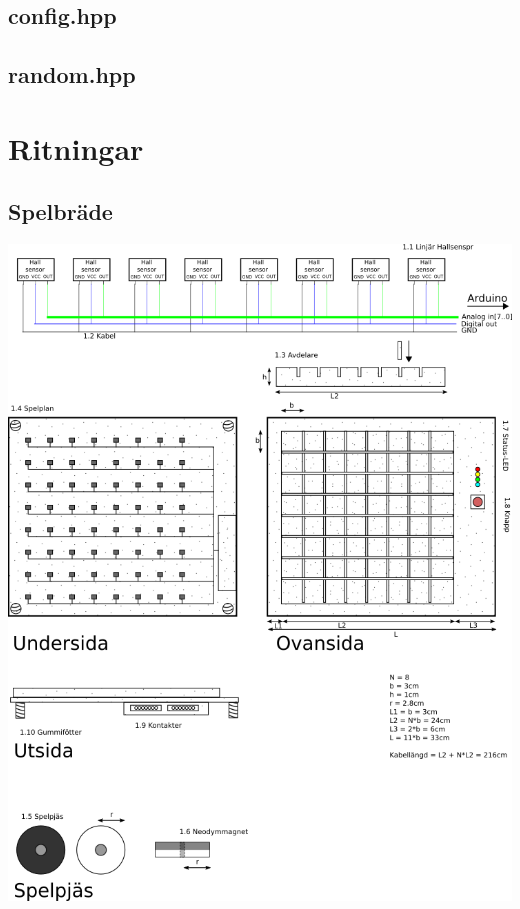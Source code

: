 \documentclass[a4paper]{article}
\begin{document}
\begin{appendix}
\subsection{config.hpp}

\subsection{random.hpp}


\section{Ritningar}\label{sketches}
\subsection{Spelbräde}
\includegraphics[width=\textwidth]{board}


\end{appendix}
\end{document}

